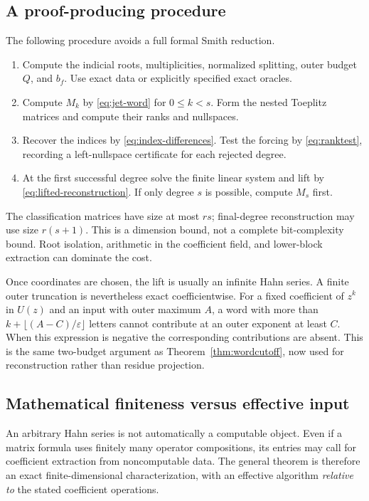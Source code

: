 \documentclass[11pt,a4paper]{article}
\numberwithin{equation}{section}
\theoremstyle{definition}
\theoremstyle{remark}
\theoremstyle{definition}
\newcommand{\eps}{\varepsilon}
\begin{document}
\subsection{A proof-producing procedure}
The following procedure avoids a full formal Smith reduction.
\begin{enumerate}[leftmargin=2em,itemsep=3pt]
\item Compute the indicial roots, multiplicities, normalized splitting, outer budget $Q$, and $b_f$. Use exact data or explicitly specified exact oracles.
\item Compute $M_k$ by \eqref{eq:jet-word} for $0\le k<s$. Form the nested Toeplitz matrices and compute their ranks and nullspaces.
\item Recover the indices by \eqref{eq:index-differences}. Test the forcing by \eqref{eq:ranktest}, recording a left-nullspace certificate for each rejected degree.
\item At the first successful degree solve the finite linear system and lift by \eqref{eq:lifted-reconstruction}. If only degree $s$ is possible, compute $M_s$ first.
\end{enumerate}
The classification matrices have size at most $rs$; final-degree reconstruction may use size $r(s+1)$. This is a dimension bound, not a complete bit-complexity bound. Root isolation, arithmetic in the coefficient field, and lower-block extraction can dominate the cost.

Once coordinates are chosen, the lift is usually an infinite Hahn series. A finite outer truncation is nevertheless exact coefficientwise. For a fixed coefficient of $z^k$ in $U(z)$ and an input with outer maximum $A$, a word with more than $k+\lfloor(A-C)/\eps\rfloor$ letters cannot contribute at an outer exponent at least $C$. When this expression is negative the corresponding contributions are absent. This is the same two-budget argument as Theorem~\ref{thm:wordcutoff}, now used for reconstruction rather than residue projection.

\subsection{Mathematical finiteness versus effective input}
An arbitrary Hahn series is not automatically a computable object. Even if a matrix formula uses finitely many operator compositions, its entries may call for coefficient extraction from noncomputable data. The general theorem is therefore an exact finite-dimensional characterization, with an effective algorithm \emph{relative to} the stated coefficient operations.
\end{document}
